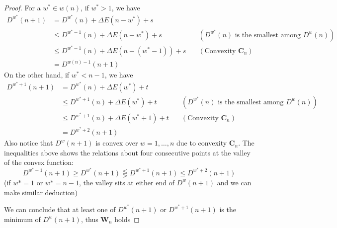 \documentclass[]{article}
\begin{document}
\begin{proof}
For a $w^*\in w(n)$, if $w^* >1$, we have
\begin{align*}
D^{w^*}(n+1) &= D^{w^*}(n) + \Delta E(n-w^*) +s\\
&\le  D^{w^* - 1}(n) + \Delta E(n-w^*) +s \quad &(\text{$D^{w^*}(n)$ is the smallest among $D^{w}(n)$})\\
&\le  D^{w^* - 1}(n) + \Delta E(n-(w^*-1)) +s \quad &(\text{Convexity $\mathbf{C}_{n}$}) \\ 
&=D^{w(n)-1}(n+1)
\end{align*}
On the other hand, if $w^* < n -1$, we have
\begin{align*}
D^{w^*+1}(n+1) &= D^{w^*}(n) + \Delta E(w^*) +t \\
&\le  D^{w^* + 1}(n) + \Delta E(w^*) +t \quad &(\text{$D^{w^*}(n)$ is the smallest among $D^{w}(n)$})\\
&\le  D^{w^* + 1}(n) + \Delta E(w^* + 1) +t \quad &(\text{Convexity $\mathbf{C}_{n}$}) \\ 
&= D^{w^*+2}(n+1)
\end{align*}
Also notice that $D^w(n+1)$ is convex over $w=1,\dots,n$ due to convexity $\mathbf{C}_{n}$. The inequalities above shows the relations about four consecutive points at the valley of the convex function:
\[
D^{w^*-1}(n+1) \ge D^{w^*}(n+1) \lesseqgtr D^{w^*+1}(n+1) \le D^{w^*+2}(n+1)
\]
(if $w* = 1$ or $w* = n-1$, the valley sits at either end of $D^w(n+1)$ and we can make similar deduction)

We can conclude that at least one of $D^{w^*}(n+1)$ or $D^{w^*+1}(n+1)$ is the minimum of $D^w(n+1)$, thus $\mathbf{W}_n$ holds


\end{proof}
\end{document}
